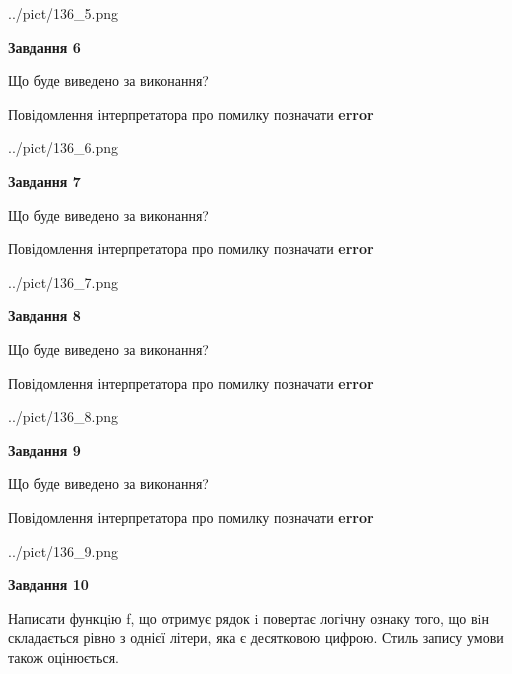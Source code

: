 \documentclass[12pt, ukrainian]{article}
\begin{document}
{\begin {large}
\begin{center}
	{../pict/136_5.png}
\end{center}
\newpage

{\begin {center}\textbf{Завдання 6}\end {center}}\par
Що буде виведено за виконання? \par
Повідомлення інтерпретатора про помилку позначати \textbf{error}

\begin{center}
	{../pict/136_6.png}
\end{center}
\newpage

{\begin {center}\textbf{Завдання 7}\end {center}}\par
Що буде виведено за виконання? \par
Повідомлення інтерпретатора про помилку позначати \textbf{error}

\begin{center}
	{../pict/136_7.png}
\end{center}
\newpage

{\begin {center}\textbf{Завдання 8}\end {center}}\par
Що буде виведено за виконання? \par
Повідомлення інтерпретатора про помилку позначати \textbf{error}

\begin{center}
	{../pict/136_8.png}
\end{center}
\newpage

{\begin {center}\textbf{Завдання 9}\end {center}}\par
Що буде виведено за виконання? \par
Повідомлення інтерпретатора про помилку позначати \textbf{error}

\begin{center}
	{../pict/136_9.png}
\end{center}
\newpage

{\begin {center}\textbf{Завдання 10}\end {center}}\par

Написати функцiю f, що отримує рядок i повертає логічну ознаку того, що вiн складається рівно з однієї літери, яка є десятковою цифрою. Стиль запису умови також оцінюється.\par
\newpage

\end {large}}
\end{document}
